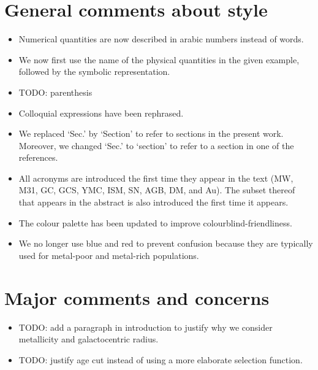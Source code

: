 \documentclass{article}
\begin{document}
\section*{General comments about style}
\begin{itemize}
\item Numerical quantities are now described in arabic numbers instead of words.
\item We now first use the name of the physical quantities in the given example,
    followed by the symbolic representation.
\item TODO: parenthesis
\item Colloquial expressions have been rephrased.
\item We replaced `Sec.' by `Section' to refer to sections in the present work.
Moreover, we changed `Sec.' to `section' to refer to a section in one of the references.
\item All acronyms are introduced the first time they appear in the text
(MW, M31, GC, GCS, YMC, ISM, SN, AGB, DM, and Au). The subset thereof that appears 
in the abstract is also introduced the first time it appears.
\item The colour palette has been updated to improve colourblind-friendliness.
\item We no longer use blue and red to prevent confusion because they are 
typically used for metal-poor and metal-rich populations.
\end{itemize}


\section*{Major comments and concerns}
\begin{itemize}
\item TODO: add a paragraph in introduction to justify why we consider metallicity
and galactocentric radius.
\item TODO: justify age cut instead of using a more elaborate selection function.
\end{itemize}
\end{document}
